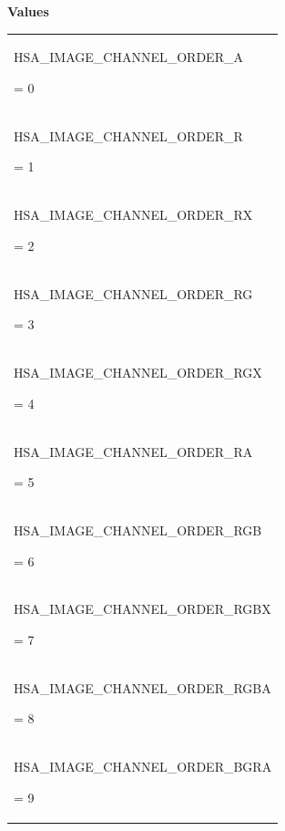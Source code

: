 \documentclass[final]{book}
\newcommand{\reftyp}[1]{#1}
\newcommand{\refenu}[1]{\reftyp{#1}}
\begin{document}
\begin{appendices}
\noindent\textbf{Values}\\[-5mm]
\begin{longtable}{@{\hspace{2em}}p{\linewidth-2em}}
\hspace{-2em}\hypertarget{group--images-1gga75748fdd35b33c62366157f3d072d65baed11acec49ddb494cc8337bc2e266853}{\refenu{HSA_IMAGE_CHANNEL_ORDER_A}} = 0\\[2mm]
\hspace{-2em}\hypertarget{group--images-1gga75748fdd35b33c62366157f3d072d65baba61f49d12096a49592b771bb1aad9f2}{\refenu{HSA_IMAGE_CHANNEL_ORDER_R}} = 1\\[2mm]
\hspace{-2em}\hypertarget{group--images-1gga75748fdd35b33c62366157f3d072d65ba563aad67f44aad98c63d1b7705575925}{\refenu{HSA_IMAGE_CHANNEL_ORDER_RX}} = 2\\[2mm]
\hspace{-2em}\hypertarget{group--images-1gga75748fdd35b33c62366157f3d072d65ba6fd63f934fb9cfc512d1086b6a7dee18}{\refenu{HSA_IMAGE_CHANNEL_ORDER_RG}} = 3\\[2mm]
\hspace{-2em}\hypertarget{group--images-1gga75748fdd35b33c62366157f3d072d65ba7ed43ac0acbe441fd638d430cd4964d5}{\refenu{HSA_IMAGE_CHANNEL_ORDER_RGX}} = 4\\[2mm]
\hspace{-2em}\hypertarget{group--images-1gga75748fdd35b33c62366157f3d072d65ba57a191eb8f3f12b7b836b5451f64f67a}{\refenu{HSA_IMAGE_CHANNEL_ORDER_RA}} = 5\\[2mm]
\hspace{-2em}\hypertarget{group--images-1gga75748fdd35b33c62366157f3d072d65ba86caace5ee95b3650d4169a25587f648}{\refenu{HSA_IMAGE_CHANNEL_ORDER_RGB}} = 6\\[2mm]
\hspace{-2em}\hypertarget{group--images-1gga75748fdd35b33c62366157f3d072d65baf05fd7b6434c4b10bc2dac6afa71e0ba}{\refenu{HSA_IMAGE_CHANNEL_ORDER_RGBX}} = 7\\[2mm]
\hspace{-2em}\hypertarget{group--images-1gga75748fdd35b33c62366157f3d072d65ba6617cc609f85a7ee9803102bada8a47d}{\refenu{HSA_IMAGE_CHANNEL_ORDER_RGBA}} = 8\\[2mm]
\hspace{-2em}\hypertarget{group--images-1gga75748fdd35b33c62366157f3d072d65ba0a0ca69e105b46c74e3361866314280b}{\refenu{HSA_IMAGE_CHANNEL_ORDER_BGRA}} = 9\\[2mm]

\end{longtable}
\end{appendices}
\end{document}
